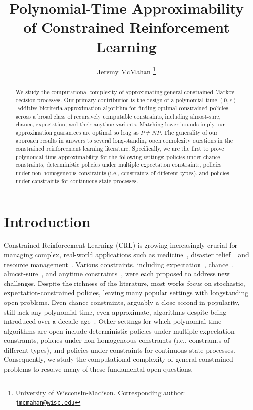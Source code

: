 \documentclass[pdftex, a4paper, 12pt]{article}
\title{Polynomial-Time Approximability of Constrained Reinforcement Learning}
\author{Jeremy McMahan \thanks{University of Wisconsin-Madison. Corresponding author: \href{mailto:jmcmahan@wisc.edu}{\texttt{jmcmahan@wisc.edu}}}}
\begin{document}
\maketitle

\begin{abstract}

    We study the computational complexity of approximating general constrained Markov decision processes. Our primary contribution is the design of a polynomial time $(0,\epsilon)$-additive bicriteria approximation algorithm for finding optimal constrained policies across a broad class of recursively computable constraints, including almost-sure, chance, expectation, and their anytime variants. Matching lower bounds imply our approximation guarantees are optimal so long as $P \neq NP$. The generality of our approach results in answers to several long-standing open complexity questions in the constrained reinforcement learning literature. Specifically, we are the first to prove polynomial-time approximability for the following settings: policies under chance constraints, deterministic policies under multiple expectation constraints, policies under non-homogeneous constraints (i.e., constraints of different types), and policies under constraints for continuous-state processes.
    
\end{abstract}



\section{Introduction}\label{sec: intro}

Constrained Reinforcement Learning (CRL) is growing increasingly crucial for managing complex, real-world applications such as medicine~\cite{MedSurvery, MedRisk, MedScheduling}, disaster relief~\cite{DisasterDigitalTwin, DisasterUAV, DisasterFlooding}, and resource management~\cite{ResourceGeneral, ResourceNetworkSlicing, ResourceUAV, ResourceMatching}. Various constraints, including expectation~\cite{cMDP-book}, chance~\cite{CCMDP-GoalComplexity}, almost-sure~\cite{AlmostSure}, and anytime constraints~\cite{acRL}, were each proposed to address new challenges. Despite the richness of the literature, most works focus on stochastic, expectation-constrained policies, leaving many popular settings with longstanding open problems. Even chance constraints, arguably a close second in popularity, still lack any polynomial-time, even approximate, algorithms despite being introduced over a decade ago~\cite{CCMDP-GoalComplexity}. Other settings for which polynomial-time algorithms are open include deterministic policies under multiple expectation constraints, policies under non-homogeneous constraints (i.e., constraints of different types), and policies under constraints for continuous-state processes. Consequently, we study the computational complexity of general constrained problems to resolve many of these fundamental open questions.
\end{document}

